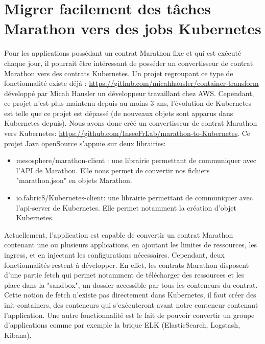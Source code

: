 \documentclass[11pt,fleqn]{book} %
\begin{document}
\section*{Migrer facilement des tâches Marathon vers des jobs Kubernetes}
Pour les applications possédant un contrat Marathon fixe et qui est exécuté chaque jour, il pourrait être intéressant de posséder un convertisseur de contrat Marathon vers des contrats Kubernetes. Un projet regroupant ce type de fonctionnalité existe déjà : \url{https://github.com/micahhausler/container-transform} développé par Micah Hausler un développeur travaillant chez AWS. Cependant, ce projet n'est plus maintenu depuis au moins 3 ans, l'évolution de Kubernetes est telle que ce projet est dépassé (de nouveaux objets sont apparus dans Kubernetes depuis). Nous avons donc créé un convertisseur de contrat Marathon vers Kubernetes: \url{https://github.com/InseeFrLab/marathon-to-Kubernetes}. Ce projet Java openSource s'appuie sur deux librairies: \begin{itemize}
    \item mesosphere/marathon-client : une librairie permettant de communiquer avec l'API de Marathon. Elle nous permet de convertir nos fichiers "marathon.json" en objets Marathon.
    \item io.fabric8/Kubernetes-client: une librairie permettant de communiquer avec l'api-server de Kubernetes. Elle permet notamment la création d'objet Kubernetes.\newline 
\end{itemize}

Actuellement, l'application est capable de convertir un contrat Marathon contenant une ou plusieurs applications, en ajoutant les limites de ressources, les ingress, et en injectant les configurations nécessaires. Cependant, deux fonctionnalités restent à développer. En effet, les contrats Marathon disposent d'une partie fetch qui permet notamment de télécharger des ressources et les place dans la "sandbox", un dossier accessible par tous les conteneurs du contrat. Cette notion de fetch n'existe pas directement dans Kubernetes, il faut créer des init-containers, des conteneurs qui s'exécuteront avant notre conteneur contenant l'application. Une autre fonctionnalité est le fait de pouvoir convertir un groupe d'applications comme par exemple la brique ELK (ElasticSearch, Logstash, Kibana).\newline
\end{document}
